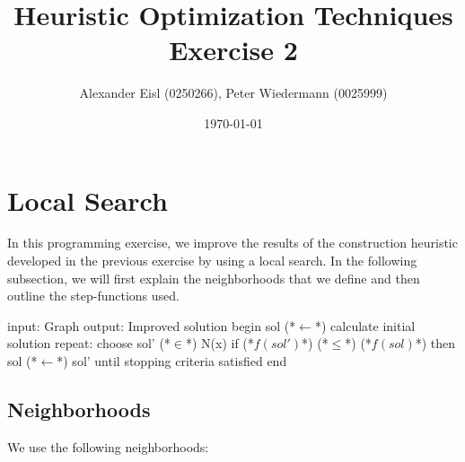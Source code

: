 \documentclass{scrartcl}
\author{Alexander Eisl (0250266), Peter Wiedermann (0025999)}
\date{\today}
\title{Heuristic Optimization Techniques \\ Exercise 2}
\begin{document}
\maketitle


\section{Local Search}
\label{sec:deterministic}
In this programming exercise, we improve the results of the
construction heuristic developed in the previous exercise by using a
local search. In the following subsection, we will first explain the
neighborhoods that we define and then outline the step-functions used.

\begin{algorithm}[caption={Local search}]
    input: Graph 
    output: Improved solution
    begin
    	sol (*$\leftarrow$*) calculate initial solution
	repeat:
		choose sol' (*$\in$*) N(x) 
		if (*$f(sol')$*) (*$\leq$*) (*$f(sol)$*) then
			sol (*$\leftarrow$*) sol'
	until stopping criteria satisfied
    end
\end{algorithm}


\subsection{Neighborhoods}
\label{neighborhoods}
We use the following neighborhoods:
\end{document}
